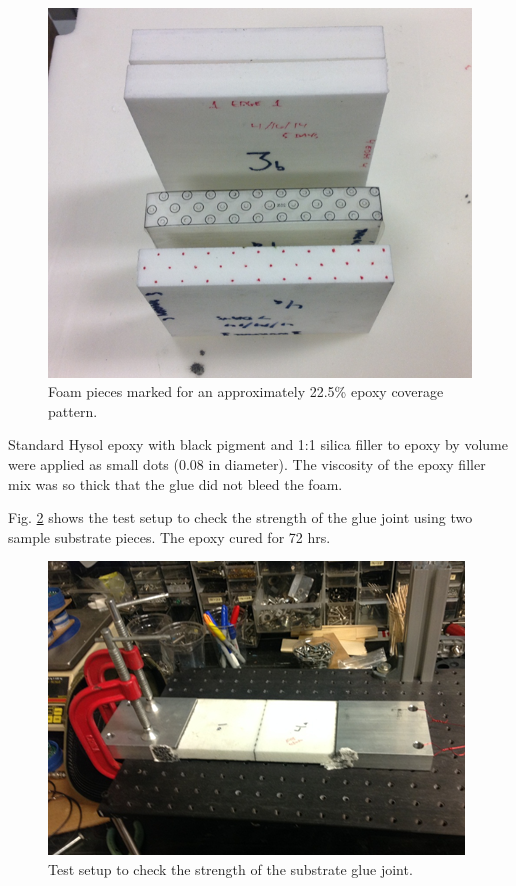\begin{figure}[ht]
    \centering
    \includegraphics[width=1.0\linewidth]{images/Pattern.png}
    \caption{Foam pieces marked for an approximately 22.5\% epoxy coverage pattern.}
    \label{fig:Pattern}
\end{figure}

Standard Hysol epoxy with black pigment and 1:1 silica filler to epoxy by volume were applied as small dots (0.08 in diameter). The viscosity of the epoxy filler mix was so thick that the glue did not bleed the foam. 

Fig. \ref{fig:Glue_joint_test} shows the test setup to check the strength of the glue joint using two sample substrate pieces. The epoxy cured for 72 hrs.

\begin{figure}[ht]
    \centering
    \includegraphics[width=0.95\linewidth]{images/Glue_joint_test.png}
    \caption{Test setup to check the strength of the substrate glue joint.}
    \label{fig:Glue_joint_test}
\end{figure}


